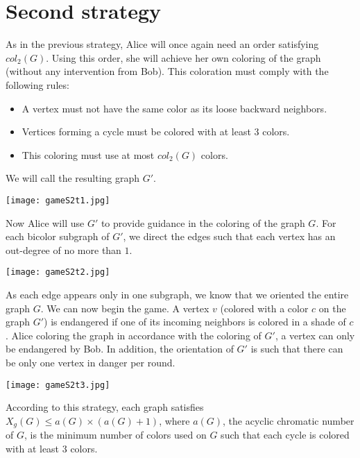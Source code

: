 \section{Second strategy}

As in the previous strategy, Alice will once again need an order satisfying $col_{2}(G)$.
Using this order, she will achieve her own coloring of the graph (without any intervention from Bob).
This coloration must comply with the following rules:
\begin{itemize}
\item A vertex must not have the same color as its loose backward neighbors.
\item Vertices forming a cycle must be colored with at least 3 colors.
\item This coloring must use at most $col_{2}(G)$ colors.
\end{itemize}

We will call the resulting graph $G'$.

\texttt{[image: gameS2t1.jpg]}

Now Alice will use $G'$ to provide guidance in the coloring of the graph $G$. For each bicolor subgraph of $G'$,
we direct the edges such that each vertex has an out-degree of no more than $1$. 

\texttt{[image: gameS2t2.jpg]}

As each edge appears only in
one subgraph, we know that we oriented the entire graph $G$. We can now begin the game. 
A vertex $v$ (colored with a color $c$ on the graph $G'$) is endangered if one of its incoming neighbors is colored in a shade of $c$. Alice coloring the graph in accordance with the coloring of $G'$, a vertex can only be endangered by Bob. In addition, the orientation of $G'$ is such that there can be only one vertex in danger per round.

\texttt{[image: gameS2t3.jpg]}

According to this strategy, each graph satisfies $X_{g}(G) \leq a(G) \times (a(G) + 1)$, where $a(G)$, the acyclic chromatic number of $G$, is the minimum number of colors used on $G$ such that each cycle is colored with at least $3$ colors.
